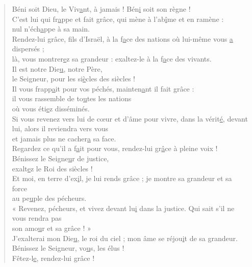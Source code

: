 \begin{verse}
Béni soit Dieu, le Viv\underline{a}nt, à jamais !\psalmstar
Bén\underline{i} soit son règne !\\

C'est lui qui fr\underline{a}ppe et fait grâce, \psalmdagger
qui mène à l'ab\underline{î}me et en ramène :\\
nul n'éch\underline{a}ppe à sa main.\\

Rendez-lui grâce, fils d'Israël, à la f\underline{a}ce des nations\psalmstar
où lui-même vous \underline{a} dispersés ;\\
là, vous montrer\underline{e}z sa grandeur :\psalmstar
exaltez-le à la f\underline{a}ce des vivants.\\

Il est notre Die\underline{u}, notre Père,\\
le Seigneur, pour les si\underline{è}cles des siècles !\\

Il vous frapp\underline{a}it pour vos péchés,\psalmstar
mainten\underline{a}nt il fait grâce :\\
il vous rassemble de to\underline{u}tes les nations\\
où vous éti\underline{e}z disséminés.\\

Si vous revenez vers lui de cœur et d'âme \psalmdagger
pour vivre, dans la vérit\underline{é}, devant lui, \psalmstar
alors il reviendra vers vous\\
et jamais plus ne cacher\underline{a} sa face.\\

Regardez ce qu'il a f\underline{a}it pour vous,\psalmstar
rendez-lui gr\underline{â}ce à pleine voix !\\
Bénissez le Seigne\underline{u}r de justice,\\
exalt\underline{e}z le Roi des siècles !\\

Et moi, en terre d'ex\underline{i}l, je lui rends grâce ; \psalmstar
je montre sa grandeur et sa force\\
au pe\underline{u}ple des pécheurs.\\

« Revenez, pécheurs, \psalmdagger
et vivez devant lu\underline{i} dans la justice. \psalmstar
Qui sait s'il ne vous rendra pas\\
son amo\underline{u}r et sa grâce ! »\\

J'exalterai mon Die\underline{u}, le roi du ciel ;\psalmstar
mon âme se réjou\underline{i}t de sa grandeur.\\
Bénissez le Seigneur, vo\underline{u}s, les élus !\\
Fêtez-l\underline{e}, rendez-lui grâce !
\end{verse}

